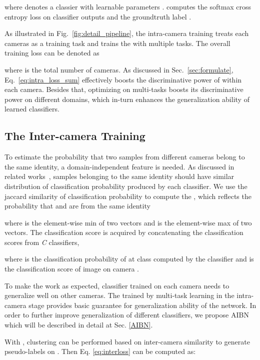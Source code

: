 \documentclass[final]{cvpr}
\begin{document}
where  denotes a classier with learnable parameters .  computes the softmax cross entropy loss on classifier outputs and the groundtruth label .

As illustrated in Fig.~\ref{fig:detail_pipeline}, the intra-camera training treats each cameras as a training task and trains the  with multiple tasks. The overall training loss can be denoted as

where  is the total number of cameras. As discussed in Sec.~\ref{sec:formulate}, Eq.~\eqref{eq:intra_loss_sum} effectively boosts the discriminative power of  within each camera. Besides that, optimizing  on multi-tasks boosts its discriminative power on different domains, which in-turn enhances the generalization ability of learned classifiers.

\subsection{The Inter-camera Training}\label{reduction}

To estimate the probability that two samples from different cameras belong to the same identity, a domain-independent feature is needed.
As discussed in related works~\cite{dou2019domain, tzeng2015simultaneous}, samples belonging to the same identity should have similar distribution of classification probability produced by each classifier. We use the jaccard similarity of classification probability to compute the , which reflects the probability that  and  are from the same identity

where  is the element-wise min of two vectors and  is the element-wise max of two vectors. The classification score  is acquired by concatenating the classification scores from \emph{C} classifiers,

where  is the classification probability of at class  computed by the classifier  and  is the classification score of image  on camera .

To make the  work as expected, classifier trained on each camera needs to generalize well on other cameras. The  trained by multi-task learning in the intra-camera stage provides basic guarantee for generalization ability of the network. In order to further improve generalization of different classifiers, we propose AIBN which will be described in detail at Sec. \ref{AIBN}.





With , clustering can be performed based on inter-camera similarity to generate pseudo-labels on . Then Eq. \eqref{eq:interloss} can be computed as:
\end{document}
